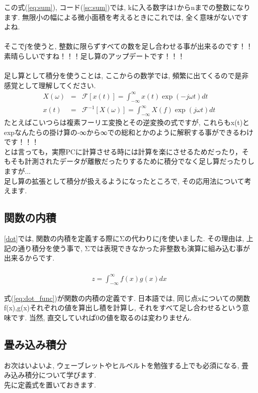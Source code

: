 \documentclass[11pt,a4paper]{jreport}
\begin{document}
この式(\ref{eq:sum}), コード(\ref{sc:sum})では, kに入る数字は1からnまでの整数になります. 無限小の幅による微小面積を考えるときにこれでは, 全く意味がないですよね.\\
\\
そこで∫を使うと, 整数に限らずすべての数を足し合わせる事が出来るのです！！\\
素晴らしいですね！！！足し算のアップデートです！！！\\
\\
足し算として積分を使うことは, ここからの数学では, 頻繁に出てくるので是非感覚として理解してください.
\begin{eqnarray}
\label{eq:int3}
X(\omega) &=& \mathcal{F}[x(t)] = \int^{\infty}_{-\infty}x(t)\exp(-j \omega t)dt \\
 x(t) &=& \mathcal{F}^{-1}[X(\omega)] = \int^{\infty}_{-\infty}X(f)\exp(j \omega t)dt 
\end{eqnarray}
たとえばこいつらは複素フーリエ変換とその逆変換の式ですが, これらもx(t)とexpなんたらの掛け算の-∞から∞での総和とかのように解釈する事ができるわけです！！！\\
とは言っても，実際PCに計算させる時には計算を楽にさせるためだったり，そもそも計測されたデータが離散だったりするために積分でなく足し算だったりしますが...\\

足し算の拡張として積分が扱えるようになったところで, その応用法について考えます. 
\subsection{関数の内積 \label{dot_func}}
\ref{dot}では, 関数の内積を定義する際にΣの代わりに∫を使いました. その理由は, 上記の通り積分を使う事で, Σでは表現できなかった非整数も演算に組み込む事が出来るからです.\\
\\

\begin{eqnarray}
\label{eq:dot_func}
z = \int^{\infty}_{-\infty} f(x)g(x)dx
\end{eqnarray}

式(\ref{eq:dot_func})が関数の内積の定義です. 日本語では, 同じ点xについての関数f(x),g(x)それぞれの値を算出し積を計算し, それをすべて足し合わせるという意味です. 当然, 直交していれば0の値を取るのは変わりません.


\subsection{畳み込み積分 \label{convolution}}
お次はいよいよ, ウェーブレットやヒルベルトを勉強する上でも必須になる, 畳み込み積分について学びます.\\
先に定義式を置いておきます.
\end{document}

